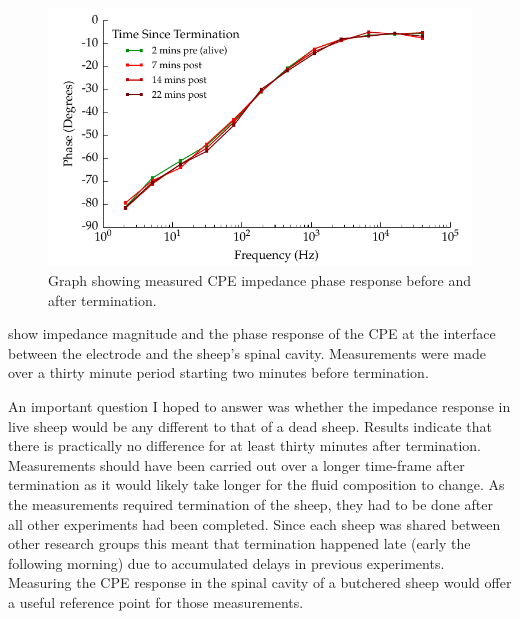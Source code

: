     \begin{figure}
      \centering
      \includegraphics{content/pt2/08-InterfaceParameters/graphics/graph_Day2_Sheep_CPE_ImpedancePhase}
      \caption{\label{fig:graph_Day2_Sheep_CPE_ImpedancePhase} Graph showing measured CPE impedance phase response before and after termination.}
    \end{figure}


     show impedance magnitude and the phase response of the CPE at the interface between the electrode and the sheep's spinal cavity.
    Measurements were made over a thirty minute period starting two minutes before termination.

    An important question I hoped to answer was whether the impedance response in live sheep would be any different to that of a dead sheep.
    Results indicate that there is practically no difference for at least thirty minutes after termination.
    Measurements should have been carried out over a longer time-frame after termination as it would likely take longer for the fluid composition to change.
    As the measurements required termination of the sheep, they had to be done after all other experiments had been completed.
    Since each sheep was shared between other research groups this meant that termination happened late (early the following morning) due to accumulated delays in previous experiments.
    Measuring the CPE response in the spinal cavity of a butchered sheep would offer a useful reference point for those measurements.


